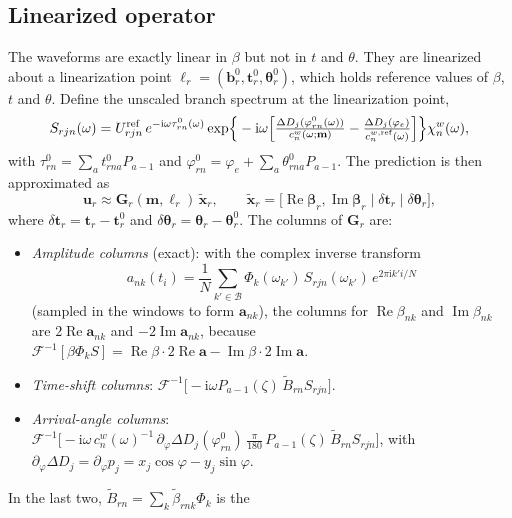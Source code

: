 \documentclass[11pt]{article}
\newcommand{\ii}{\mathrm{i}}
\newcommand{\Ifft}{\mathcal{F}^{-1}}
\newcommand{\Real}{\operatorname{Re}}
\newcommand{\Imag}{\operatorname{Im}}
\begin{document}
\subsection{Linearized operator}\label{sec:G}
The waveforms are exactly linear in $\beta$ but not in $t$ and $\theta$.
They are linearized about a linearization point
$\bm{\ell}_r=(\mathbf{b}^0_r,\mathbf{t}^0_r,\bm{\theta}^0_r)$, which
holds reference values of $\beta$, $t$ and $\theta$. Define the unscaled
branch spectrum at the linearization point,
\begin{equation}
 S_{rjn}(\omega)=U^{\rm ref}_{rjn}\,e^{-\ii\omega\tau^0_{rn}(\omega)}
 \exp\!\Big\{-\ii\omega\Big[\tfrac{\Delta D_j(\varphi^0_{rn}(\omega))}{c^w_n(\omega;\mathbf{m})}-\tfrac{\Delta D_j(\varphi_e)}{c^{w,\rm ref}_n(\omega)}\Big]\Big\}\chi^w_n(\omega),
\end{equation}
with $\tau^0_{rn}=\sum_at^0_{rna}P_{a-1}$ and
$\varphi^0_{rn}=\varphi_e+\sum_a\theta^0_{rna}P_{a-1}$. The prediction is
then approximated as
\begin{equation}\label{eq:lin}
 \mathbf{u}_r\approx\mathbf{G}_r(\mathbf{m},\bm\ell_r)\,\tilde{\mathbf{x}}_r,\qquad
 \tilde{\mathbf{x}}_r=\big[\Real\bm\beta_r,\Imag\bm\beta_r\;|\;\delta\mathbf{t}_r\;|\;\delta\bm\theta_r\big],
\end{equation}
where $\delta\mathbf{t}_r=\mathbf{t}_r-\mathbf{t}^0_r$ and
$\delta\bm\theta_r=\bm\theta_r-\bm\theta^0_r$. The columns of $\mathbf{G}_r$ are:
\begin{itemize}
\item \emph{Amplitude columns} (exact): with the complex inverse transform
  \[
   a_{nk}(t_i)=\frac1N\sum_{k'\in\mathcal{B}}\Phi_k(\omega_{k'})\,S_{rjn}(\omega_{k'})\,e^{2\pi\ii k'i/N}
  \]
  (sampled in the windows to form $\mathbf{a}_{nk}$), the columns for $\Real\beta_{nk}$ and
  $\Imag\beta_{nk}$ are $2\Real\mathbf{a}_{nk}$ and
  $-2\Imag\mathbf{a}_{nk}$, because
  $\Ifft[\beta\Phi_kS]=\Real\beta\cdot2\Real\mathbf{a}-\Imag\beta\cdot2\Imag\mathbf{a}$.
\item \emph{Time-shift columns}: $\Ifft\big[-\ii\omega P_{a-1}(\zeta)\,\tilde B_{rn}S_{rjn}\big]$.
\item \emph{Arrival-angle columns}:
  $\Ifft\big[-\ii\omega\,c^w_n(\omega)^{-1}\,\partial_\varphi\Delta D_j(\varphi^0_{rn})\,\tfrac{\pi}{180}\,P_{a-1}(\zeta)\,\tilde B_{rn}S_{rjn}\big]$,
  with $\partial_\varphi\Delta D_j=\partial_\varphi p_j=x_j\cos\varphi-y_j\sin\varphi$.
\end{itemize}
In the last two, $\tilde B_{rn}=\sum_k\tilde\beta_{rnk}\Phi_k$ is the
\end{document}

